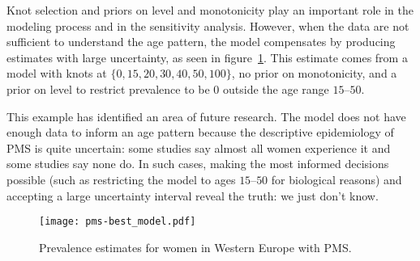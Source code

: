 Knot selection and priors on level and monotonicity play an important
role in the modeling process and in the sensitivity analysis.
However, when the data are not sufficient to understand the age
pattern, the model compensates by producing estimates with large
uncertainty, as seen in figure~\ref{fig:app-pms best}.  This estimate
comes from a model with knots at $\{0, 15, 20, 30, 40, 50, 100\}$, no
prior on monotonicity, and a prior on level to restrict prevalence to
be $0$ outside the age range $15$--$50$.

This example has identified an area of future research.  The model does
not have enough data to inform an age pattern because the descriptive
epidemiology of PMS is quite uncertain: some studies say almost all women
experience it and some studies say none do.  In such cases, making the
most informed decisions possible (such as restricting the model to
ages $15$--$50$ for biological reasons) and accepting a large uncertainty
interval reveal the truth: we just don't know.

    \begin{figure}
        \begin{center}
            \texttt{[image: pms-best\_model.pdf]}
        \end{center}
        \caption{Prevalence estimates for women
          in Western Europe with PMS.}
        \label{fig:app-pms best}
    \end{figure}









